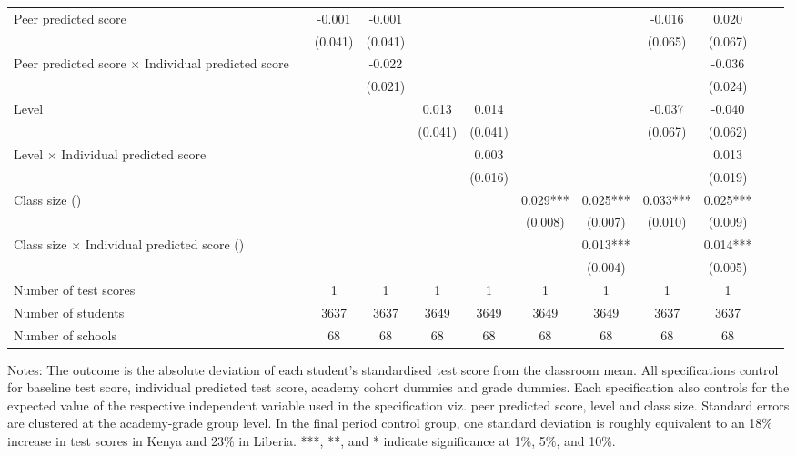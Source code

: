 \begin{center}
\begin{scriptsize}
\begin{threeparttable}
\begin{tabular} {@{} l l c c c c c c c c c c  @{}}
\\
Peer predicted score &  & -0.001 & -0.001 &  &  &  &  & -0.016 & 0.020 \\
                 &  & (0.041) & (0.041) &  &  &  &  & (0.065) & (0.067) \\
Peer predicted score $\times$ Individual predicted score &  &  & -0.022 &  &  &  &  &  & -0.036 \\
                 &  &  & (0.021) &  &  &  &  &  & (0.024) \\
Level &  &  &  & 0.013 & 0.014 &  &  & -0.037 & -0.040 \\
                 &  &  &  & (0.041) & (0.041) &  &  & (0.067) & (0.062) \\
Level $\times$ Individual predicted score &  &  &  &  & 0.003 &  &  &  & 0.013 \\
                 &  &  &  &  & (0.016) &  &  &  & (0.019) \\
Class size (\times 10) &  &  &  &  &  & 0.029*** & 0.025*** & 0.033*** & 0.025*** \\
                 &  &  &  &  &  & (0.008) & (0.007) & (0.010) & (0.009) \\
Class size $\times$ Individual predicted score (\times 10) &  &  &  &  &  &  & 0.013*** &  & 0.014*** \\
                 &  &  &  &  &  &  & (0.004) &  & (0.005) \\
\midrule
Number of test scores &  & 1 & 1 & 1 & 1 & 1 & 1 & 1 & 1 \\
Number of students &  & 3637 & 3637 & 3649 & 3649 & 3649 & 3649 & 3637 & 3637 \\
Number of schools &  & 68 & 68 & 68 & 68 & 68 & 68 & 68 & 68 \\
\bottomrule
\end{tabular}
\begin{tablenotes}
\item Notes: The outcome is the absolute deviation of each student's standardised test score from the classroom mean. All specifications control for baseline test score, individual predicted test score, academy cohort dummies and grade dummies. Each specification also controls for the expected value of the respective independent variable used in the specification viz. peer predicted score, level and class size. Standard errors are clustered at the academy-grade group level. In the final period control group, one standard deviation is roughly equivalent to an 18\% increase in test scores in Kenya and 23\% in Liberia. ***, **, and * indicate significance at 1\%, 5\%, and 10\%.\end{tablenotes}
\end{threeparttable}
\end{scriptsize}
\end{center}
\clearpage
